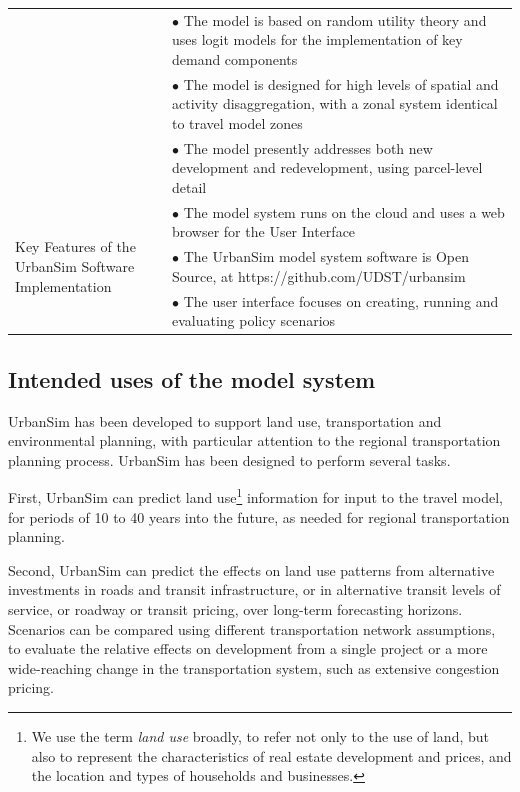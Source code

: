 \begin{table}[htbp]
\begin{center}
\begin{tabular}{ p{1.5in} p{4.4in} }
& $\bullet$ The model is based on random utility theory and uses logit models for the implementation of key demand components\\
& $\bullet$ The model is designed for high levels of spatial and activity disaggregation, with a zonal system identical to travel model zones\\
& $\bullet$ The model presently addresses both new development and redevelopment, using parcel-level detail\\
\midrule
\multirow[c]{3}{1.5in}{Key Features of the UrbanSim Software Implementation}
& $\bullet$ The model system runs on the cloud and uses a web browser for the User Interface\\
& $\bullet$ The UrbanSim model system software is Open Source, at https://github.com/UDST/urbansim\\
& $\bullet$ The user interface focuses on creating, running and evaluating policy scenarios\\
\bottomrule
\end{tabular}
\end{center}
\end{table}

\subsection{Intended uses of the model system}

UrbanSim has been developed to support land use, transportation and environmental planning, with particular attention to the regional transportation planning process. UrbanSim has been designed to perform several tasks.

First, UrbanSim can predict land use\footnote{We use the term \emph{land use} broadly, to refer not only to the
use of land, but also to represent the characteristics of real estate development and prices, and the location and types of households and businesses.} information for input to the travel model, for periods of 10 to 40 years into the future, as needed for regional transportation planning.

Second, UrbanSim can predict the effects on land use patterns from alternative investments in roads and transit infrastructure, or in alternative transit levels of service, or roadway or transit pricing, over long-term forecasting horizons. Scenarios can be compared using different transportation network assumptions, to evaluate the relative effects on development from a single project or a more wide-reaching change in the transportation system, such as extensive congestion pricing.


